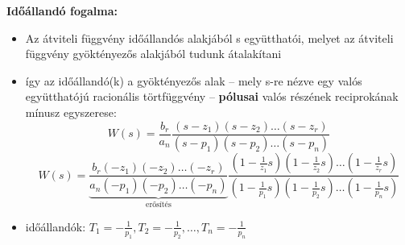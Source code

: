 \noindent \textbf{Időállandó fogalma:}
\begin{itemize}
    \item Az átviteli függvény időállandós alakjából s együtthatói, melyet az átviteli függvény gyöktényezős alakjából tudunk átalakítani
    \item így az időállandó(k) a gyöktényezős alak – mely s-re nézve egy valós együtthatójú racionális törtfüggvény – \textbf{pólusai} valós részének reciprokának mínusz egyszerese:
    $$ W(s) = \frac{b_r}{a_n} \frac{(s-z_1)(s-z_2) \dots (s-z_r)}{(s-p_1)(s-p_2) \dots (s-p_n)} $$
    $$ W(s) = \underbrace{ \frac{b_r (-z_1)(-z_2) \dots (-z_r)}{a_n (-p_1)(-p_2) \dots (-p_n)} }_{\text{erősítés}} \frac{(1-\frac{1}{z_1}s)(1-\frac{1}{z_2}s) \dots (1-\frac{1}{z_r}s)}{(1-\frac{1}{p_1}s)(1-\frac{1}{p_2}s) \dots (1-\frac{1}{p_n}s)} $$
    \item időállandók: $T_1 = -\frac{1}{p_1}, T_2 = -\frac{1}{p_2}, \dots, T_n = -\frac{1}{p_n}$
\end{itemize}
